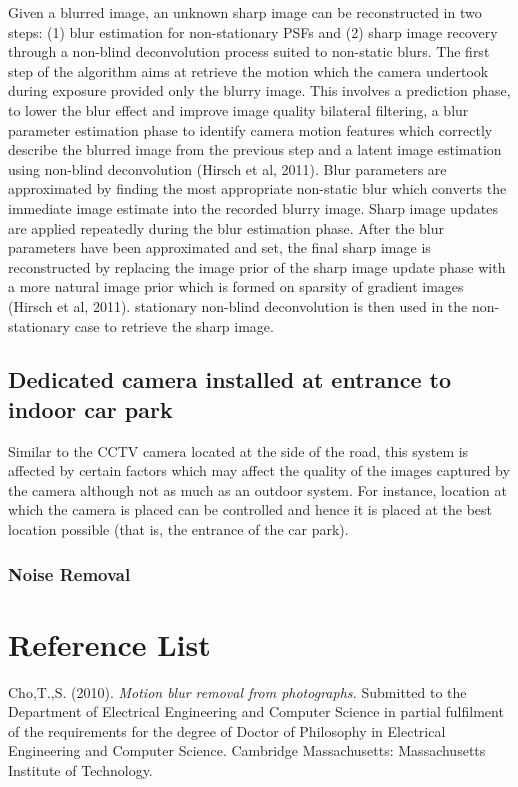 \documentclass[a4paper, 12pt]{article}
\begin{document}
\parskip 0.2in
Given a blurred image, an unknown sharp  image can be reconstructed in two steps: (1) blur estimation for non-stationary PSFs and (2) sharp image recovery through a non-blind deconvolution process suited to non-static blurs. The first step of the algorithm aims at retrieve the motion which the camera undertook during exposure provided only the blurry image. This involves a prediction phase, to lower the blur effect and improve image quality bilateral filtering, a blur parameter estimation phase to identify camera motion features which correctly describe the blurred image from the previous step and a latent image estimation using non-blind deconvolution (Hirsch et al, 2011). Blur parameters are approximated by finding the most appropriate non-static blur which converts the  immediate image estimate into the recorded blurry image. Sharp image updates are applied repeatedly during the blur estimation phase. After the blur parameters have been approximated and set, the final sharp image is reconstructed by replacing the image prior of the sharp image update phase with a more natural image prior which is formed on sparsity of gradient images (Hirsch et al, 2011). stationary non-blind deconvolution is then used in the non-stationary case to retrieve the sharp image. 

\newpage
\subsection{Dedicated camera installed at entrance to indoor car park}

Similar to the CCTV camera located at the side of the road, this system is affected by certain factors which may affect the quality of the images captured by the camera although not as much as an outdoor system. For instance, location at which the camera is placed can be controlled and hence it is placed at the best location possible (that is, the entrance of the car park). 

\subsubsection{Noise Removal}




\newpage

\section{Reference List} 

Cho,T.,S. (2010). \textit{Motion blur removal from photographs.} Submitted to the Department of Electrical Engineering and Computer Science in partial fulfilment of the requirements for the degree of Doctor of Philosophy in Electrical Engineering and Computer Science. Cambridge Massachusetts: Massachusetts Institute of Technology.
\parskip 0.2in 
\end{document}
